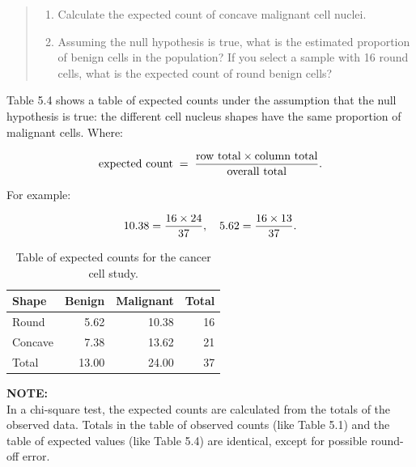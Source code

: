 \documentclass[
]{report}
\providecommand{\tightlist}{%
  \setlength{\itemsep}{0pt}\setlength{\parskip}{0pt}}
\begin{document}
\begin{quote}
\begin{enumerate}
\def\labelenumi{\arabic{enumi}.}
\setcounter{enumi}{16}
\tightlist
\item
  Calculate the expected count of concave malignant cell nuclei.\\
\item
  Assuming the null hypothesis is true, what is the estimated proportion of benign cells in the population? If you select a sample with 16 round cells, what is the expected count of round benign cells?
\end{enumerate}
\end{quote}

Table 5.4 shows a table of expected counts under the assumption that the null hypothesis is true: the different cell nucleus shapes have the same proportion of malignant cells. Where:

\begin{align}
\text{expected count} \;=\; \frac{\text{row total} \times \text{column total}}{\text{overall total}}.
\notag
\end{align}

For example:

\begin{align}
10.38 = \frac{16 \times 24}{37}, \notag
\quad
5.62 = \frac{16 \times 13}{37}. \notag
\end{align}

\begin{table}

\caption{\label{tab:tab4}Table of expected counts for the cancer cell study.}
\centering
\begin{tabular}[t]{lrrr}
\toprule
Shape & Benign & Malignant & Total\\
\midrule
Round & 5.62 & 10.38 & 16\\
Concave & 7.38 & 13.62 & 21\\
Total & 13.00 & 24.00 & 37\\
\bottomrule
\end{tabular}
\end{table}

\large

\textbf{NOTE:}\\
In a chi-square test, the expected counts are calculated from the totals of the observed data. Totals in the table of observed counts (like Table 5.1) and the table of expected values (like Table 5.4) are identical, except for possible round-off error.\\
\normalsize
\end{document}
